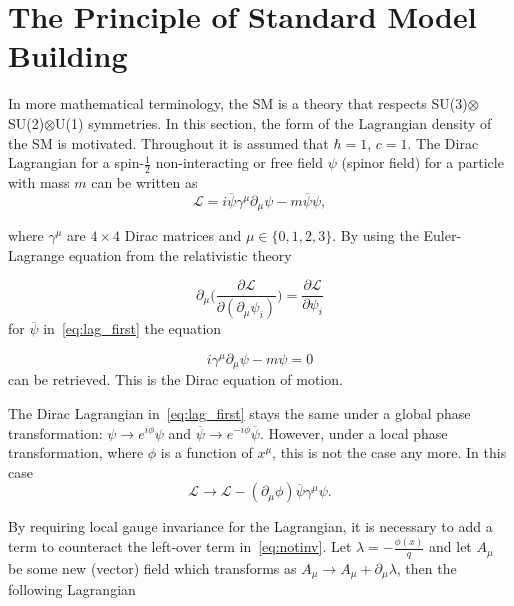 \section{The Principle of Standard Model Building}
\label{build}
In more mathematical terminology, the \gls{SM} is a theory that respects SU(3)$\otimes$SU(2)$\otimes$U(1) symmetries. In this section, the form of the Lagrangian density of the \gls{SM} is motivated. Throughout it is assumed that $\hbar=1$, $c=1$. The Dirac Lagrangian for a spin-$\frac{1}{2}$ non-interacting or free field $\psi$ (spinor field) for a particle with mass $m$ can be written as 
\begin{equation}
\mathcal{L} = i\overline{\psi}\gamma^{\mu}\partial_{\mu}\psi - m\overline{\psi}\psi,
\label{eq:lag_first}
\end{equation}

\noindent where $\gamma^{\mu}$ are $4\times 4$ Dirac matrices and $\mu\in\{0,1,2,3\}$. By using the Euler-Lagrange equation from the relativistic theory

\begin{equation}
	\partial_{\mu}\Big(\frac{\partial{\mathcal{L}}}{\partial(\partial_{\mu}\psi_{i})} \Big) =\frac{\partial \mathcal{L}}{\partial\psi_{i}}
\label{eq:lag_first}
\end{equation}
for $\overline\psi$ in~\autoref{eq:lag_first} the equation 

\begin{equation}
 i\gamma^{\mu}\partial_{\mu}\psi - m\psi = 0
\label{eq:lag_first2}
\end{equation}
can be retrieved. This is the Dirac equation of motion.

The Dirac Lagrangian in~\autoref{eq:lag_first} stays the same under a global phase transformation: $\psi \rightarrow e^{i\phi}\psi$ and $\overline\psi \rightarrow e^{-i\phi}\overline\psi$. However, under a local phase transformation, where $\phi$ is a function of $x^{\mu}$, this is not the case any more. In this case
\begin{equation}
\mathcal{L} \rightarrow \mathcal{L}- (\partial_{\mu}\phi) \overline{\psi}\gamma^{\mu}\psi.
\label{eq:notinv}
\end{equation}

By requiring local gauge invariance for the Lagrangian, it is necessary to add a term to counteract the left-over term in~\autoref{eq:notinv}. Let $\lambda=-\frac{\phi(x)}{q}$ and let $A_{\mu}$ be some new (vector) field which transforms as $A_{\mu} \rightarrow A_{\mu} + \partial_{\mu}\lambda$, then the following Lagrangian

